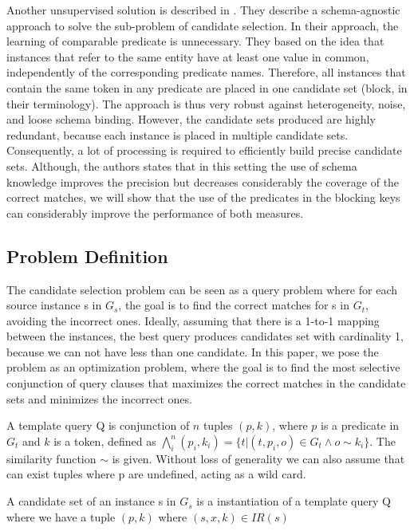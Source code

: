 Another unsupervised solution is described in \cite{DBLP:conf/wsdm/PapadakisINF11}. They describe  a schema-agnostic approach to solve the sub-problem of candidate selection. In their approach, the learning of comparable predicate is unnecessary. They based on the idea that instances that refer to the same entity have at least one value in common, independently of the corresponding predicate names. Therefore, all instances that contain the same token in any predicate are placed in one candidate set (block, in their terminology). The approach is thus very robust against heterogeneity, noise, and loose schema binding. However, the candidate sets produced are highly redundant, because each instance is placed in multiple candidate sets. Consequently, a lot of processing is required to efficiently build precise candidate sets. Although, the authors states that in this setting the use of schema knowledge improves the precision but decreases considerably the coverage of the correct matches, we will show that the use of the predicates in the blocking keys can considerably improve the performance of both measures. 


\subsection{Problem Definition} 
The candidate selection problem can be seen as a query problem where for each source instance s in $G_s$, the goal is to find the correct matches for s in $G_t$, avoiding the incorrect ones.  Ideally, assuming that there is a 1-to-1 mapping between the instances, the best query produces candidates set with cardinality 1, because we can not have less than one candidate. In this paper, we pose the problem as an optimization problem, where the goal is to find the most selective conjunction of query clauses that maximizes the correct matches in the candidate sets and minimizes the incorrect ones.

\begin{definition}   A template query Q is conjunction of $n$ tuples $(p, k)$, where $p$ is a predicate in $G_t$ and $k$ is a token, defined as $ \bigwedge_{i}^n (p_i, k_i)=\{t | (t,p_i,o) \in G_t  \land o \sim k_i  \}$. The similarity function $\sim$ is given. Without loss of generality we can also assume that can exist tuples where p are undefined, acting as a wild card. 
\end{definition} 
 
\begin{definition}   A candidate set of an instance s in $G_s$ is a instantiation of a template query Q where we have a tuple $(p,k)$ where $(s,x,k) \in IR(s)$
\end{definition} 

